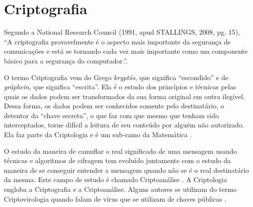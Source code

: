 

\section{Criptografia}
\label{sec:criptografia}
Segundo a National Research Council (1991, apud STALLINGS, 2008, pg. 15), “A criptografia provavelmente é o aspecto mais importante da segurança de comunicações e está se tornando cada vez mais importante como um componente básico para a segurança do computador.”.

O termo Criptografia vem do Grego \textit{kryptós}, que significa “escondido” e de \textit{gráphein}, que significa “escrita”. Ela é o estudo dos princípios e técnicas pelas quais os dados podem ser transformados da sua forma original em outra ilegível. Dessa forma, os dados podem ser conhecidos somente pelo destinatário, o detentor da “chave secreta”, o que faz com que mesmo que tenham sido interceptados, torne difícil a leitura de seu conteúdo por alguém não autorizado. Ela faz parte da Criptologia e é um sub-ramo da Matemática \cite{knudsen98}.

O estudo da maneira de camuflar o real significado de uma mensagem usando técnicas e algoritmos de cifragem tem evoluído juntamente com o estudo da maneira de se conseguir entender a mensagem quando não se é o real destinatário da mesma. Este campo de estudo é chamado Criptoanálise \cite{gaines56}. A Criptologia engloba a Criptografia e a Criptoanálise. Alguns autores se utilizam do termo Criptovirologia quando falam de vírus que se utilizam de chaves públicas \cite{young04}.

